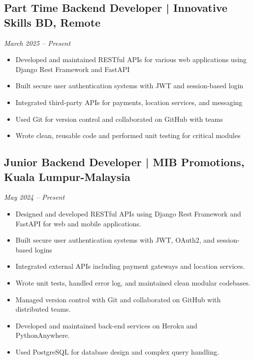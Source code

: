 \documentclass[a4paper,10pt]{article}
\begin{document}
\subsection*{Part Time Backend Developer | Innovative Skills BD, Remote}
\textit{March 2025 – Present} \\

\begin{itemize}
    \item Developed and maintained RESTful APIs for various web applications using Django Rest Framework and FastAPI
    \item Built secure user authentication systems with JWT and session-based login
    \item Integrated third-party APIs for payments, location services, and messaging
    \item Used Git for version control and collaborated on GitHub with teams 
    \item Wrote clean, reusable code and performed unit testing for critical modules
\end{itemize}

\subsection*{Junior Backend Developer | MIB Promotions, Kuala Lumpur-Malaysia}
\textit{May 2024 – Present} \\
\begin{itemize}
    \item Designed and developed RESTful APIs using Django Rest Framework and FastAPI for web and mobile applications. 
    \item Built secure user authentication systems with JWT, OAuth2, and session-based logins
    \item Integrated external APIs including payment gateways and location services.
    \item Wrote unit tests, handled error log, and maintained clean modular codebases.
    \item Managed version control with Git and collaborated on GitHub with distributed teams.
    \item Developed and maintained back-end services on Heroku and PythonAnywhere.
    \item Used PostgreSQL for database design and complex query handling.\\

\end{itemize}
\end{document}
